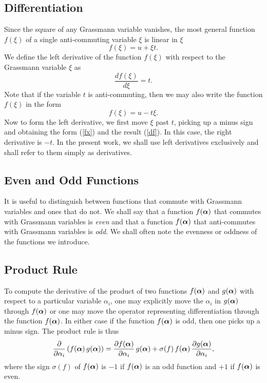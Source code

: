 \documentclass[12pt]{article}
\def\beq{\begin{equation}}
\def\eeq{\end{equation}}
\def\p{\partial}
\def\a{\alpha}
\def\ba{{\mbox{\boldmath$\alpha$}}}
\def\s{\sigma}
\def\x{\xi}
\begin{document}
\subsection{Differentiation}
Since the square of any Grassmann variable vanishes,
the most general function $ f( \x ) $
of a single anti-commuting variable
$ \x $ is linear in $ \x $
\beq
f( \x ) = u + \x t .
\label {fx}
\eeq
We define the left derivative of
the function $ f( \x ) $ with respect to
the Grassmann variable $ \x $ as
\beq
\frac { d f( \x ) }{ d\x } = t .
\label {df}
\eeq
Note that if the variable $ t $ is anti-commuting,
then we may also write the function $ f( \x ) $ in the form
\beq
f( \x ) = u - t \x .
\label {xf}
\eeq
Now to form the left derivative,
we first move $ \x $ past $ t $,
picking up a minus sign and obtaining
the form (\ref {fx}) and the result (\ref {df}). 
In this case, the right derivative is $ - t $.
In the present work, we shall use left derivatives
exclusively and shall refer to them simply
as derivatives.
\subsection{Even and Odd Functions}
It is useful to distinguish between
functions that commute
with Grassmann variables and ones that do not.
We shall say that a function $ f( \ba ) $
that commutes with Grassmann variables
is \emph{even\/}
and that a function $ f( \ba ) $
that anti-commutes with Grassmann variables
is \emph{odd\/}.
We shall often note the evenness or oddness
of the functions we introduce.

\subsection{Product Rule}
To compute the derivative of the product
of two functions $ f( \ba ) $ and $ g( \ba ) $
with respect to a particular variable $ \a_i $,
one may explicitly move the $ \a_i $ in
$ g( \ba ) $ through $ f( \ba ) $ or one may move
the operator representing differentiation
through the function $ f( \ba ) $.
In either case if the function $ f( \ba ) $
is odd, then one picks up a minus sign.
The product rule is thus
\beq 
\frac { \p }{ \p \a_i } \left( f( \ba ) \, g( \ba ) \right) =
\frac { \p f( \ba ) }{ \p \a_i } \, g( \ba )
+ \s( f ) \, f( \ba ) \, \frac { \p g( \ba )  }{ \p \a_i } ,
\label {prodrule}
\eeq
where the sign $ \s( f ) $ of $ f( \ba ) $
is $ - 1 $ if $ f( \ba ) $
is an odd function and $ + 1 $ if $ f( \ba ) $
is even.
\end{document}
